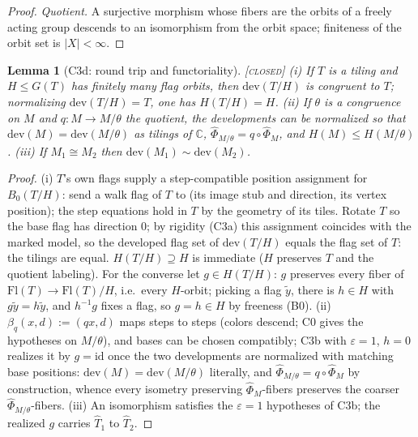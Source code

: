\documentclass[11pt]{article}
\newtheorem{lemma}[theorem]{Lemma}
\theoremstyle{definition}
\newcommand{\CLOSED}{\textnormal{\textsc{[closed]}}}
\newcommand{\Flags}{\mathrm{Fl}}
\newcommand{\dev}{\mathrm{dev}}
\newcommand{\C}{\mathbb{C}}
\begin{document}
\begin{proof}
\emph{Quotient.} A surjective morphism whose fibers are the orbits of a freely acting
group descends to an isomorphism from the orbit space; finiteness of the orbit set is
$|X| < \infty$.
\end{proof}

\begin{lemma}[C3d: round trip and functoriality]\label{lem:C3d} \CLOSED\;
(i) If $T$ is a tiling and $H \le G(T)$ has finitely many flag orbits, then
$\dev(T/H)$ is congruent to $T$; normalizing $\dev(T/H) = T$, one has $H(T/H) = H$.
(ii) If $\theta$ is a congruence on $M$ and $q : M \to M/\theta$ the quotient, the
developments can be normalized so that $\dev(M) = \dev(M/\theta)$ as tilings of $\C$,
$\hat\Phi_{M/\theta} = q \circ \hat\Phi_M$, and $H(M) \le H(M/\theta)$.
(iii) If $M_1 \cong M_2$ then $\dev(M_1) \sim \dev(M_2)$.
\end{lemma}

\begin{proof}
(i) $T$'s own flags supply a step-compatible position assignment for $B_0(T/H)$: send a
walk flag of $T$ to (its image stub and direction, its vertex position); the step
equations hold in $T$ by the geometry of its tiles. Rotate $T$ so the base flag has
direction $0$; by rigidity (C3a) this assignment coincides with the marked model, so the
developed flag set of $\dev(T/H)$ equals the flag set of $T$: the tilings are equal.
$H(T/H) \supseteq H$ is immediate ($H$ preserves $T$ and the quotient labeling). For the
converse let $g \in H(T/H)$: $g$ preserves every fiber of
$\Flags(T) \to \Flags(T)/H$, i.e.\ every $H$-orbit; picking a flag $\tilde y$, there is
$h \in H$ with $g\tilde y = h\tilde y$, and $h^{-1}g$ fixes a flag, so $g = h \in H$ by
freeness (B0).
(ii) $\beta_q(x,d) := (q x, d)$ maps steps to steps (colors descend; C0 gives the
hypotheses on $M/\theta$), and bases can be chosen compatibly; C3b with
$\varepsilon = 1$, $h = 0$ realizes it by $g = \mathrm{id}$ once the two developments
are normalized with matching base positions: $\dev(M) = \dev(M/\theta)$ literally, and
$\hat\Phi_{M/\theta} = q \circ \hat\Phi_M$ by construction, whence every isometry
preserving $\hat\Phi_M$-fibers preserves the coarser $\hat\Phi_{M/\theta}$-fibers.
(iii) An isomorphism satisfies the $\varepsilon = 1$ hypotheses of C3b; the realized $g$
carries $\hat T_1$ to $\hat T_2$.
\end{proof}
\end{document}
